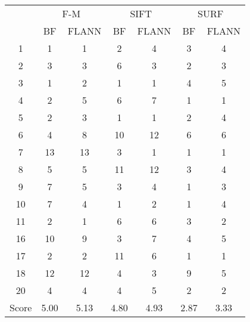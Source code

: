 \documentclass[draft,final]{vutinfth} %
\begin{document}
\begin{appendices}
\begin{minipage}{\linewidth}
\centering
\begin{tabular}{c|cc|cc|cc}
\multirow{2}{*}{ } & \multicolumn{2}{c}{ F-M } & \multicolumn{2}{c}{ SIFT } & \multicolumn{2}{c}{ SURF } \\
& BF & FLANN & BF & FLANN & BF & FLANN \\
\hline
1 & 1 & 1 & 2 & 4 & 3 & 4 \\
2 & 3 & 3 & 6 & 3 & 2 & 3 \\
3 & 1 & 2 & 1 & 1 & 4 & 5 \\
4 & 2 & 5 & 6 & 7 & 1 & 1 \\
5 & 2 & 3 & 1 & 1 & 2 & 4 \\
6 & 4 & 8 & 10 & 12 & 6 & 6 \\
7 & 13 & 13 & 3 & 1 & 1 & 1 \\
8 & 5 & 5 & 11 & 12 & 3 & 4 \\
9 & 7 & 5 & 3 & 4 & 1 & 3 \\
10 & 7 & 4 & 1 & 2 & 1 & 4 \\
11 & 2 & 1 & 6 & 6 & 3 & 2 \\
16 & 10 & 9 & 3 & 7 & 4 & 5 \\
17 & 2 & 2 & 11 & 6 & 1 & 1 \\
18 & 12 & 12 & 4 & 3 & 9 & 5 \\
20 & 4 & 4 & 4 & 5 & 2 & 2 \\
\hline
Score & 5.00 & 5.13 & 4.80 & 4.93 & 2.87 & 3.33 \\
\end{tabular}

 \label{tab:20Mean} 
\end{minipage}


\end{appendices}
\end{document}
